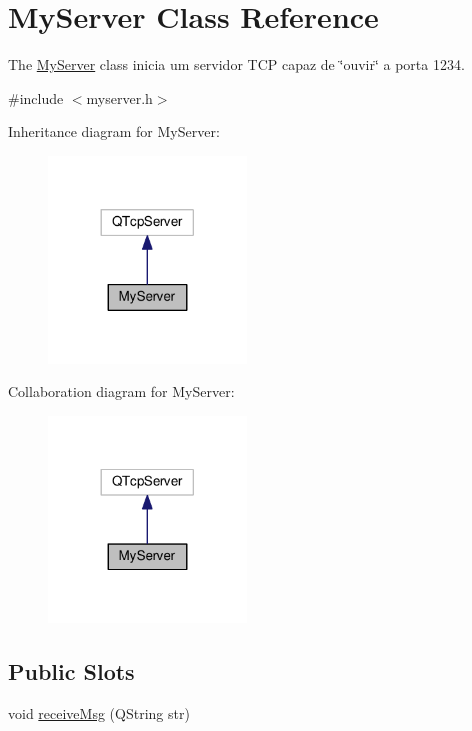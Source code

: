 \hypertarget{class_my_server}{}\section{My\+Server Class Reference}
\label{class_my_server}


The \hyperlink{class_my_server}{My\+Server} class inicia um servidor T\+CP capaz de \char`\"{}ouvir\char`\"{} a porta 1234.  




{\ttfamily \#include $<$myserver.\+h$>$}



Inheritance diagram for My\+Server\+:
\nopagebreak
\begin{figure}[H]
\begin{center}
\leavevmode
\includegraphics[width=149pt]{class_my_server__inherit__graph}
\end{center}
\end{figure}


Collaboration diagram for My\+Server\+:
\nopagebreak
\begin{figure}[H]
\begin{center}
\leavevmode
\includegraphics[width=149pt]{class_my_server__coll__graph}
\end{center}
\end{figure}
\subsection*{Public Slots}
\begin{DoxyCompactItemize}
\item 
void \hyperlink{class_my_server_ac795ee6f1607c0fa4e635a0da2bf2164}{receive\+Msg} (Q\+String str)
\end{DoxyCompactItemize}
